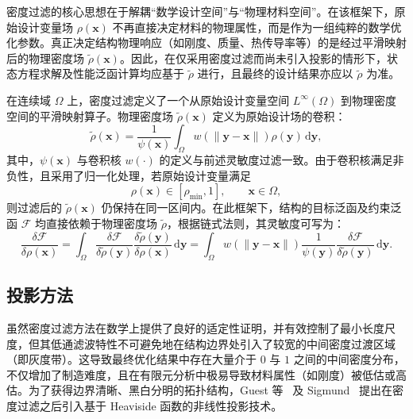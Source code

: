 密度过滤的核心思想在于解耦“数学设计空间”与“物理材料空间”。在该框架下，原始设计变量场 $\rho(\boldsymbol{x})$ 不再直接决定材料的物理属性，而是作为一组纯粹的数学优化参数。真正决定结构物理响应（如刚度、质量、热传导率等）的是经过平滑映射后的物理密度场 $\tilde{\rho}(\boldsymbol{x})$。因此，在仅采用密度过滤而尚未引入投影的情形下，状态方程求解及性能泛函计算均应基于 $\tilde{\rho}$ 进行，且最终的设计结果亦应以 $\tilde{\rho}$ 为准。

在连续域 $\Omega$ 上，密度过滤定义了一个从原始设计变量空间 $L^\infty(\Omega)$ 到物理密度空间的平滑映射算子。物理密度场 $\tilde{\rho}(\boldsymbol{x})$ 定义为原始设计场的卷积：
\begin{equation} \label{eq:ch2_density_filter}
	\tilde{\rho}(\boldsymbol{x}) = \frac{1}{\psi(\boldsymbol{x})}\int_{\Omega} w(\|\boldsymbol{y} - \boldsymbol{x}\|) \rho(\boldsymbol{y}) \, \mathrm{d}\boldsymbol{y},
\end{equation}
其中，$\psi(\boldsymbol{x})$ 与卷积核 $w(\cdot)$ 的定义与前述灵敏度过滤一致。由于卷积核满足非负性，且采用了归一化处理，若原始设计变量满足
\[
\rho(\boldsymbol{x})\in[\rho_{\min},1], \qquad \boldsymbol{x}\in\Omega,
\]
则过滤后的 $\tilde{\rho}(\boldsymbol{x})$ 仍保持在同一区间内。在此框架下，结构的目标泛函及约束泛函 $\mathcal{F}$ 均直接依赖于物理密度场 $\tilde{\rho}$，根据链式法则，其灵敏度可写为：
\begin{equation} \label{eq:ch2_density_filter_sensitivity}
	\frac{\delta\mathcal{F}}{\delta\rho(\boldsymbol{x})} = \int_{\Omega}\frac{\delta\mathcal{F}}{\delta\tilde{\rho}(\boldsymbol{y})}\frac{\delta\tilde{\rho}(\boldsymbol{y})}{\delta\rho(\boldsymbol{x})}\,\mathrm{d}\boldsymbol{y} = \int_{\Omega} w(\|\boldsymbol{y} - \boldsymbol{x}\|) \frac{1}{\psi(\boldsymbol{y})}\frac{\delta\mathcal{F}}{\delta\tilde{\rho}(\boldsymbol{y})}\, \mathrm{d}\boldsymbol{y}.
\end{equation}


\subsection{投影方法}
\label{subsec:projection_methods}

虽然密度过滤方法在数学上提供了良好的适定性证明，并有效控制了最小长度尺度，但其低通滤波特性不可避免地在结构边界处引入了较宽的中间密度过渡区域（即灰度带）。这导致最终优化结果中存在大量介于 $0$ 与 $1$ 之间的中间密度分布，不仅增加了制造难度，且在有限元分析中极易导致材料属性（如刚度）被低估或高估。为了获得边界清晰、黑白分明的拓扑结构，Guest 等~\cite{guestAchievingMinimumLength2004b} 及 Sigmund~\cite{sigmundMorphologybasedBlackWhite2007b} 提出在密度过滤之后引入基于 Heaviside 函数的非线性投影技术。

